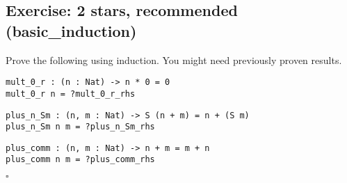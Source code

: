 \subsection{Exercise: 2 stars, recommended
(basic\_induction)}\label{exercise-2-stars-recommended-basic_induction}

Prove the following using induction. You might need previously proven
results.

\begin{verbatim}
mult_0_r : (n : Nat) -> n * 0 = 0
mult_0_r n = ?mult_0_r_rhs
\end{verbatim}

\begin{verbatim}
plus_n_Sm : (n, m : Nat) -> S (n + m) = n + (S m)
plus_n_Sm n m = ?plus_n_Sm_rhs
\end{verbatim}

\begin{verbatim}
plus_comm : (n, m : Nat) -> n + m = m + n
plus_comm n m = ?plus_comm_rhs
\end{verbatim}

\(\square\)
